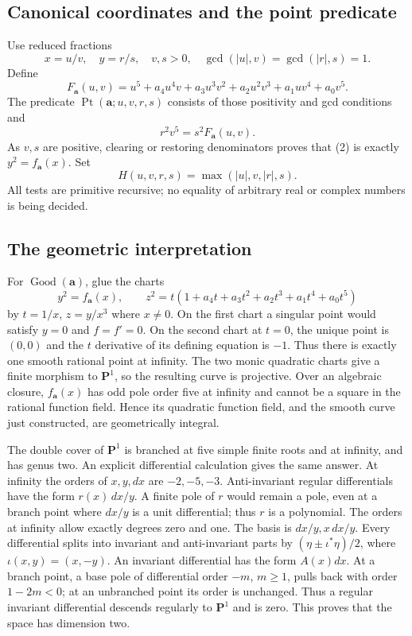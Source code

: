 \documentclass[11pt,letterpaper]{article}
\newcommand{\Good}{\operatorname{Good}}
\newcommand{\Pt}{\operatorname{Pt}}
\theoremstyle{definition}
\begin{document}
\subsection{Canonical coordinates and the point predicate}
Use reduced fractions
\[
 x=u/v,\quad y=r/s,\quad v,s>0,\quad
 \gcd(|u|,v)=\gcd(|r|,s)=1.
\]
Define
\[
 F_{\mathbf a}(u,v)=u^5+a_4u^4v+a_3u^3v^2+
                    a_2u^2v^3+a_1uv^4+a_0v^5.
\]
The predicate $\Pt(\mathbf a;u,v,r,s)$ consists of those positivity
and gcd conditions and
\[
                 r^2v^5=s^2F_{\mathbf a}(u,v).            \tag{2}
\]
As $v,s$ are positive, clearing or restoring denominators proves that
(2) is exactly $y^2=f_{\mathbf a}(x)$. Set
\[
                 H(u,v,r,s)=\max(|u|,v,|r|,s).           \tag{3}
\]
All tests are primitive recursive; no equality of arbitrary real or
complex numbers is being decided.

\subsection{The geometric interpretation}
For $\Good(\mathbf a)$, glue the charts
\[
 y^2=f_{\mathbf a}(x),\qquad
 z^2=t(1+a_4t+a_3t^2+a_2t^3+a_1t^4+a_0t^5)              \tag{4}
\]
by $t=1/x$, $z=y/x^3$ where $x\ne0$.
On the first chart a singular point would satisfy $y=0$ and $f=f'=0$.
On the second chart at $t=0$, the unique point is $(0,0)$ and the
$t$ derivative of its defining equation is $-1$. Thus there is exactly
one smooth rational point at infinity.
The two monic quadratic charts give a finite morphism to $\mathbf P^1$,
so the resulting curve is projective. Over an algebraic closure,
$f_{\mathbf a}(x)$ has odd pole order five at infinity and cannot be
a square in the rational function field. Hence its quadratic function
field, and the smooth curve just constructed, are geometrically integral.

The double cover of $\mathbf P^1$ is branched at five simple finite
roots and at infinity, and has genus two. An explicit differential
calculation gives the same answer. At infinity the orders of $x,y,dx$
are $-2,-5,-3$. Anti-invariant regular differentials have the form
$r(x)\,dx/y$. A finite pole of $r$ would remain a pole, even at a
branch point where $dx/y$ is a unit differential; thus $r$ is a
polynomial. The orders at infinity allow exactly degrees zero and one.
The basis is $dx/y,x\,dx/y$. Every differential splits into invariant
and anti-invariant parts by $(\eta\pm\iota^*\eta)/2$, where
$\iota(x,y)=(x,-y)$. An invariant differential has the form $A(x)dx$.
At a branch point, a base pole of differential order $-m$, $m\geq1$,
pulls back with order $1-2m<0$; at an unbranched point its order is
unchanged. Thus a regular invariant differential descends regularly
to $\mathbf P^1$ and is zero.
This proves that the space has dimension two.
\end{document}
